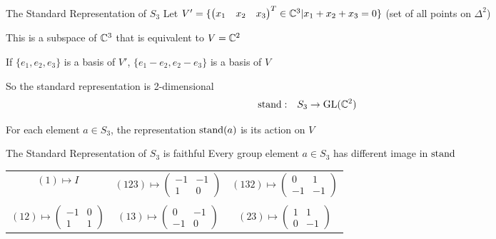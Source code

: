 \begin{frame}{The Standard Representation of $S_3$}
    \large
    Let $V' = \{\begin{pmatrix}
        x_1 & x_2 & x_3
    \end{pmatrix}^T \in \mathbb{C}^3 | x_1 + x_2 + x_3 = 0\}$
    (set of all points on $\Delta^2$)
    
    \pause
    This is a subspace of $\mathbb{C}^3$ that is equivalent to $V = \mathbb{C}^2$

    \pause
    If $\{e_1, e_2, e_3\}$ is a basis of $V'$,
    $\{e_1 - e_2, e_2 - e_3\}$ is a basis of $V$
    
    \vspace{1em}
    \pause
    So the standard representation is 2-dimensional
    \begin{align*}
        \operatorname{stand}: \quad & S_3 \to \operatorname{GL}(\mathbb{C}^2)
    \end{align*}
    
    \pause
    For each element $a \in S_3$, the representation $\operatorname{stand}(a)$ is its action on $V$
\end{frame}

\begin{frame}{The Standard Representation of $S_3$ is faithful}
    Every group element $a \in S_3$ has different image in $\operatorname{stand}$

    \pause
    \vspace{1em}
    \centering
    \begin{tabular}{c c c}
        $(1) \mapsto I$ & \pause $(123) \mapsto \begin{pmatrix}
            -1 & -1 \\
            1 & 0
        \end{pmatrix}$ & \pause $(132) \mapsto \begin{pmatrix}
            0 & 1 \\
            -1 & -1
        \end{pmatrix}$ \\\\ \pause $(12) \mapsto \begin{pmatrix}
            -1 & 0 \\
            1 & 1
        \end{pmatrix}$ & \pause $(13) \mapsto \begin{pmatrix}
            0 & -1 \\
            -1 & 0
        \end{pmatrix}$ & \pause $(23) \mapsto \begin{pmatrix}
            1 & 1 \\
            0 & -1
        \end{pmatrix}$
    \end{tabular}
\end{frame}

